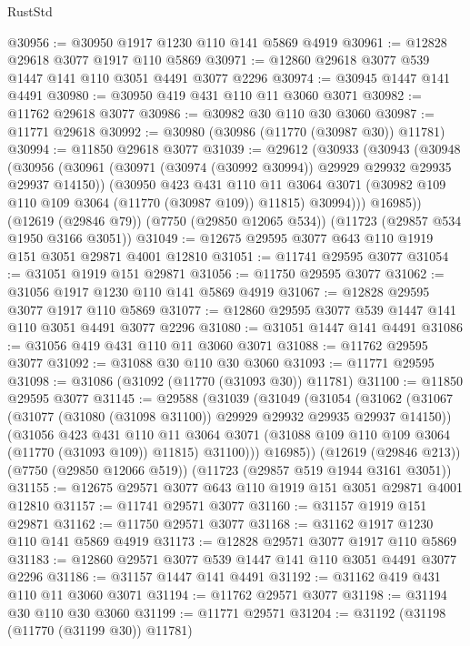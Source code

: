 \begin{lexlean}{RustStd}
\begin{coremodule}
@30956 := @30950 @1917 @1230 @110 @141 @5869 @4919
@30961 := @12828 @29618 @3077 @1917 @110 @5869
@30971 := @12860 @29618 @3077 @539 @1447 @141 @110 @3051 @4491 @3077 @2296
@30974 := @30945 @1447 @141 @4491
@30980 := @30950 @419 @431 @110 @11 @3060 @3071
@30982 := @11762 @29618 @3077
@30986 := @30982 @30 @110 @30 @3060
@30987 := @11771 @29618
@30992 := @30980 (@30986 (@11770 (@30987 @30)) @11781)
@30994 := @11850 @29618 @3077
@31039 := @29612
    (@30933
      (@30943
        (@30948
          (@30956
            (@30961 (@30971 (@30974 (@30992 @30994)) @29929 @29932 @29935 @29937 @14150))
            (@30950
              @423
              @431
              @110
              @11
              @3064
              @3071
              (@30982 @109 @110 @109 @3064 (@11770 (@30987 @109)) @11815)
              @30994)))
        @16985))
    (@12619 (@29846 @79))
    (@7750 (@29850 @12065 @534))
    (@11723 (@29857 @534 @1950 @3166 @3051))
@31049 := @12675 @29595 @3077 @643 @110 @1919 @151 @3051 @29871 @4001 @12810
@31051 := @11741 @29595 @3077
@31054 := @31051 @1919 @151 @29871
@31056 := @11750 @29595 @3077
@31062 := @31056 @1917 @1230 @110 @141 @5869 @4919
@31067 := @12828 @29595 @3077 @1917 @110 @5869
@31077 := @12860 @29595 @3077 @539 @1447 @141 @110 @3051 @4491 @3077 @2296
@31080 := @31051 @1447 @141 @4491
@31086 := @31056 @419 @431 @110 @11 @3060 @3071
@31088 := @11762 @29595 @3077
@31092 := @31088 @30 @110 @30 @3060
@31093 := @11771 @29595
@31098 := @31086 (@31092 (@11770 (@31093 @30)) @11781)
@31100 := @11850 @29595 @3077
@31145 := @29588
    (@31039
      (@31049
        (@31054
          (@31062
            (@31067 (@31077 (@31080 (@31098 @31100)) @29929 @29932 @29935 @29937 @14150))
            (@31056
              @423
              @431
              @110
              @11
              @3064
              @3071
              (@31088 @109 @110 @109 @3064 (@11770 (@31093 @109)) @11815)
              @31100)))
        @16985))
    (@12619 (@29846 @213))
    (@7750 (@29850 @12066 @519))
    (@11723 (@29857 @519 @1944 @3161 @3051))
@31155 := @12675 @29571 @3077 @643 @110 @1919 @151 @3051 @29871 @4001 @12810
@31157 := @11741 @29571 @3077
@31160 := @31157 @1919 @151 @29871
@31162 := @11750 @29571 @3077
@31168 := @31162 @1917 @1230 @110 @141 @5869 @4919
@31173 := @12828 @29571 @3077 @1917 @110 @5869
@31183 := @12860 @29571 @3077 @539 @1447 @141 @110 @3051 @4491 @3077 @2296
@31186 := @31157 @1447 @141 @4491
@31192 := @31162 @419 @431 @110 @11 @3060 @3071
@31194 := @11762 @29571 @3077
@31198 := @31194 @30 @110 @30 @3060
@31199 := @11771 @29571
@31204 := @31192 (@31198 (@11770 (@31199 @30)) @11781)

\end{coremodule}
\end{lexlean}
